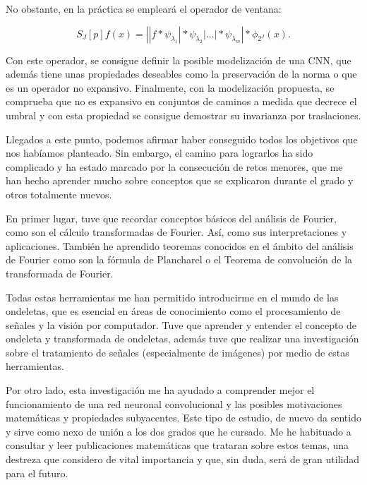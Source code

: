 \medskip

\noindent No obstante, en la práctica se empleará el operador de ventana:

\begin{equation}
  S_J[p]f(x)=\left| |f \ast \psi_{\lambda_1} | \ast \psi_{\lambda_2} | \ldots | \ast \psi_{\lambda_m} \right| \ast \phi_{2^J}(x).
\end{equation}

\noindent Con este operador, se consigue definir la posible modelización de una CNN, que además tiene unas propiedades deseables como la preservación de la norma o que es un operador no expansivo. Finalmente, con la modelización propuesta, se comprueba que no es expansivo en conjuntos de caminos a medida que decrece el umbral y con esta propiedad se consigue demostrar su invarianza por traslaciones.

\medskip

\noindent Llegados a este punto, podemos afirmar haber conseguido todos los objetivos que nos habíamos planteado. Sin embargo, el camino para lograrlos ha sido complicado y ha estado marcado por la consecución de retos menores, que me han hecho aprender mucho sobre conceptos que se explicaron durante el grado y otros totalmente nuevos.

\medskip

\noindent En primer lugar, tuve que recordar conceptos básicos del análisis de Fourier, como son el cálculo transformadas de Fourier. Así, como sus interpretaciones y aplicaciones. También he aprendido teoremas conocidos en el ámbito del análisis de Fourier como son la fórmula de Plancharel o el Teorema de convolución de la transformada de Fourier. 

\medskip

\noindent Todas estas herramientas me han permitido introducirme en el mundo de las ondeletas, que es esencial en áreas de conocimiento como el procesamiento de señales y la visión por computador. Tuve que aprender y entender el concepto de ondeleta y transformada de ondeletas, además tuve que realizar una investigación sobre el tratamiento de señales (especialmente de imágenes) por medio de estas herramientas.

\medskip

\noindent Por otro lado, esta investigación me ha ayudado a comprender mejor el funcionamiento de una red neuronal convolucional y las posibles motivaciones matemáticas y propiedades subyacentes. Este tipo de estudio, de nuevo da sentido y sirve como nexo de unión a los dos grados que he cursado. Me he habituado a consultar y leer publicaciones matemáticas que trataran sobre estos temas, una destreza que considero de vital importancia y que, sin duda, será de gran utilidad para el futuro.

\endinput